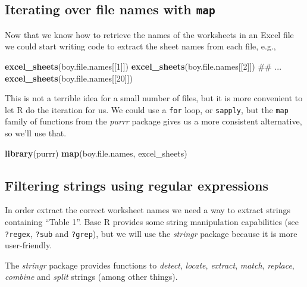 \documentclass[]{book}
\newenvironment{Shaded}{\begin{snugshade}}{\end{snugshade}}
\newcommand{\KeywordTok}[1]{\textcolor[rgb]{0.13,0.29,0.53}{\textbf{#1}}}
\newcommand{\DecValTok}[1]{\textcolor[rgb]{0.00,0.00,0.81}{#1}}
\newcommand{\NormalTok}[1]{#1}
\begin{document}
\subsection{\texorpdfstring{Iterating over file names with
\texttt{map}}{Iterating over file names with map}}\label{iterating-over-file-names-with-map}

Now that we know how to retrieve the names of the worksheets in an Excel
file we could start writing code to extract the sheet names from each
file, e.g.,

\begin{Shaded}
\begin{Highlighting}[]
\KeywordTok{excel_sheets}\NormalTok{(boy.file.names[[}\DecValTok{1}\NormalTok{]])}
\KeywordTok{excel_sheets}\NormalTok{(boy.file.names[[}\DecValTok{2}\NormalTok{]])}
\NormalTok{## ...}
\KeywordTok{excel_sheets}\NormalTok{(boy.file.names[[}\DecValTok{20}\NormalTok{]])}
\end{Highlighting}
\end{Shaded}

This is not a terrible idea for a small number of files, but it is more
convenient to let R do the iteration for us. We could use a \texttt{for}
loop, or \texttt{sapply}, but the \texttt{map} family of functions from
the \emph{purrr} package gives us a more consistent alternative, so
we'll use that.

\begin{Shaded}
\begin{Highlighting}[]
\KeywordTok{library}\NormalTok{(purrr)}
\KeywordTok{map}\NormalTok{(boy.file.names, excel_sheets)}
\end{Highlighting}
\end{Shaded}

\subsection{Filtering strings using regular
expressions}\label{filtering-strings-using-regular-expressions}

In order extract the correct worksheet names we need a way to extract
strings containing ``Table 1''. Base R provides some string manipulation
capabilities (see \texttt{?regex}, \texttt{?sub} and \texttt{?grep}),
but we will use the \emph{stringr} package because it is more
user-friendly.

The \emph{stringr} package provides functions to \emph{detect},
\emph{locate}, \emph{extract}, \emph{match}, \emph{replace},
\emph{combine} and \emph{split} strings (among other things).
\end{document}
